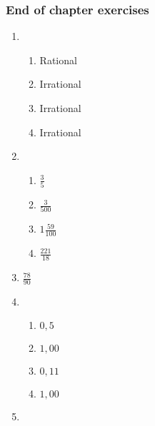 {\begin{multicols}{3}
\subsubsection*{End of chapter exercises} %


\begin{enumerate}[noitemsep, label=\textbf{\arabic*}. ] 
\item%
    \begin{enumerate}[noitemsep, label=\textbf{(\alph*)} ] 
    \item Rational%
    \item Irrational%
    \item Irrational%
    \item Irrational%
    \end{enumerate}
\item %
    \begin{enumerate}[noitemsep, label=\textbf{(\alph*)} ] 
    \item $\frac{3}{5}$%
    \item $\frac{3}{500}$%
    \item $1\frac{59}{100}$%
    \item $\frac{221}{18}$%
    \end{enumerate}
\setcounter{enumi}{3}
\item $\frac{78}{90}$%


\item %
    \begin{enumerate}[noitemsep, label=\textbf{(\alph*)} ]  
    \item $0,5$%
    \item $1,00$%
    \item $0,11$%
    \item $1,00$%
    \end{enumerate}

\item %


\end{enumerate}
\end{multicols}}

